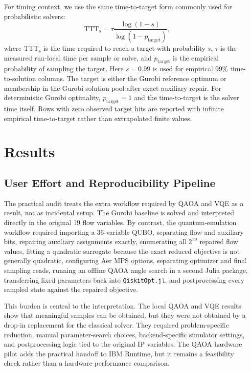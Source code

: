 For timing context, we use the same time-to-target form commonly used for
probabilistic solvers:
\begin{equation}
\mathrm{TTT}_s
= \tau \frac{\log(1 - s)}{\log(1 - p_{\mathrm{target}})} ,
\label{eq:ds-mfg-ttt}
\end{equation}
where $\mathrm{TTT}_s$ is the time required to reach a target with probability
$s$, $\tau$ is the measured run-local time per sample or solve, and
$p_{\mathrm{target}}$ is the empirical probability of sampling the target.
Here $s=0.99$ is used for empirical 99\% time-to-solution columns. The target
is either the Gurobi reference optimum or membership in the Gurobi solution pool
after exact auxiliary repair. For deterministic Gurobi optimality,
$p_{\mathrm{target}}=1$ and the time-to-target is the solver time itself.
Rows with zero observed target hits are reported with infinite empirical
time-to-target rather than extrapolated finite values.

\section{Results}
\label{sec:ds-mfg-results}

\subsection{User Effort and Reproducibility Pipeline}
\label{subsec:ds-mfg-workflow-burden}

The practical audit treats the extra workflow required by QAOA and VQE as a
result, not as incidental setup. The Gurobi baseline is solved and interpreted
directly in the original 19 flow variables. By contrast, the quantum-emulation
workflow required importing a 36-variable QUBO, separating flow and auxiliary
bits, repairing auxiliary assignments exactly, enumerating all $2^{19}$ repaired
flow values, fitting a quadratic surrogate because the exact reduced objective
is not generally quadratic, configuring Aer MPS options, separating optimizer
and final sampling reads, running an offline QAOA angle search in a second Julia
package, transferring fixed parameters back into \texttt{QiskitOpt.jl}, and
postprocessing every sampled state against the repaired objective.

This burden is central to the interpretation. The local QAOA and VQE results
show that meaningful samples can be obtained, but they were not obtained by a
drop-in replacement for the classical solver. They required problem-specific
reduction, manual parameter-search choices, backend-specific simulator settings,
and postprocessing logic tied to the original IP variables. The QAOA hardware
pilot adds the practical handoff to IBM Runtime, but it remains a feasibility
check rather than a hardware-performance comparison.

